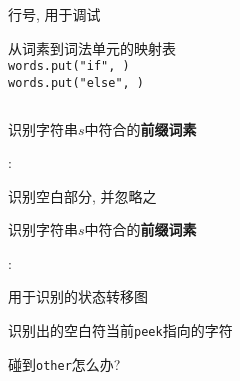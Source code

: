 \begin{frame}{}
  \begin{center}

    \vspace{0.60cm}
    \begin{columns}
        \begin{description}
          \setlength{\itemsep}{8pt}
          \item[line:] 行号, 用于调试
          \item[peek:] 
          \item[words:] 从词素到词法单元的映射表 \\[5pt]
            \texttt{words.put("if", \ifkw)} \\
            \texttt{words.put("else", \elsekw)}
        \end{description}
    \end{columns}
  \end{center}
\end{frame}

\begin{frame}{}
  \begin{center}
    识别字符串$s$中符合的{\bf 前缀词素}

    \vspace{0.50cm}
    \ws: \blank \quad \tab \quad \line

    \pause
    \vspace{0.80cm}

    识别空白部分, 并忽略之
  \end{center}
\end{frame}

\begin{frame}{}
  \begin{center}
    识别字符串$s$中符合的{\bf 前缀词素}

    \vspace{0.60cm}
    \ws: \blank \quad \tab \quad \line

    \vspace{0.60cm}

    用于识别的状态转移图

    \pause
    \vspace{0.60cm}
    \red{$\ast$:} 识别出的空白符当前\texttt{peek}指向的字符

    \pause
    \vspace{0.40cm}
     碰到\texttt{other}怎么办?
  \end{center}
\end{frame}

